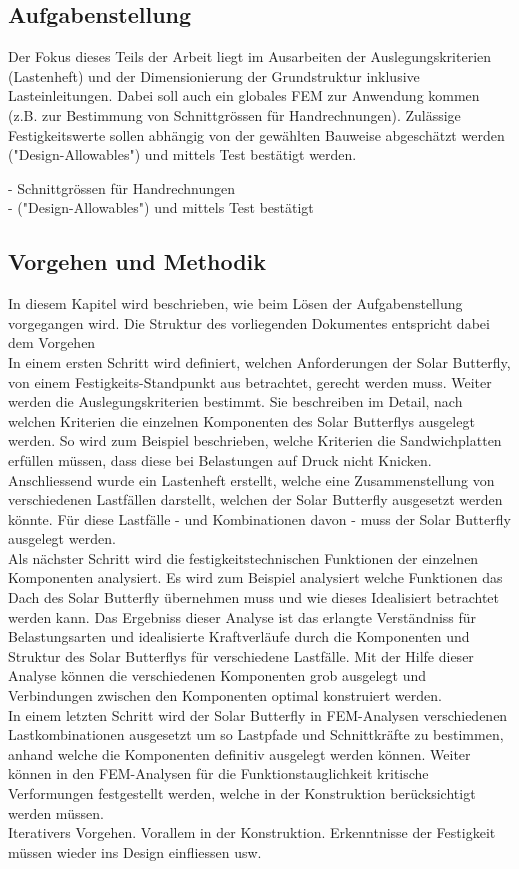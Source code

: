 \subsection{Aufgabenstellung}
Der Fokus dieses Teils der Arbeit liegt im Ausarbeiten der Auslegungskriterien (Lastenheft) und der Dimensionierung der Grundstruktur inklusive Lasteinleitungen.
Dabei soll auch ein globales FEM zur Anwendung kommen (z.B. zur Bestimmung von Schnittgrössen für Handrechnungen).
Zulässige Festigkeitswerte sollen abhängig von der gewählten Bauweise abgeschätzt werden ("Design-Allowables") und mittels Test bestätigt werden.

  - Schnittgrössen für Handrechnungen\\
  - ("Design-Allowables") und mittels Test bestätigt

\subsection{Vorgehen und Methodik}
In diesem Kapitel wird beschrieben, wie beim Lösen der Aufgabenstellung vorgegangen wird. Die Struktur des vorliegenden Dokumentes entspricht dabei dem Vorgehen\\

In einem ersten Schritt wird definiert, welchen Anforderungen der Solar Butterfly, von einem Festigkeits-Standpunkt aus betrachtet, gerecht werden muss. Weiter werden die Auslegungskriterien bestimmt. Sie beschreiben im Detail, nach welchen Kriterien die einzelnen Komponenten des Solar Butterflys ausgelegt werden. So wird zum Beispiel beschrieben, welche Kriterien die Sandwichplatten erfüllen müssen, dass diese bei Belastungen auf Druck nicht Knicken.\\
Anschliessend wurde ein Lastenheft erstellt, welche eine Zusammenstellung von verschiedenen Lastfällen darstellt, welchen der Solar Butterfly ausgesetzt werden könnte. Für diese Lastfälle - und Kombinationen davon - muss der Solar Butterfly ausgelegt werden.\\
Als nächster Schritt wird die festigkeitstechnischen Funktionen der einzelnen Komponenten analysiert. Es wird zum Beispiel analysiert welche Funktionen das Dach des Solar Butterfly übernehmen muss und wie dieses Idealisiert betrachtet werden kann. Das Ergebniss dieser Analyse ist das erlangte Verständniss für Belastungsarten und idealisierte Kraftverläufe durch die Komponenten und Struktur des Solar Butterflys für verschiedene Lastfälle. Mit der Hilfe dieser Analyse können die verschiedenen Komponenten grob ausgelegt und Verbindungen zwischen den Komponenten optimal konstruiert werden.\\
In einem letzten Schritt wird der Solar Butterfly in FEM-Analysen verschiedenen Lastkombinationen ausgesetzt um so Lastpfade und Schnittkräfte zu bestimmen, anhand welche die Komponenten definitiv ausgelegt werden können. Weiter können in den FEM-Analysen für die Funktionstauglichkeit kritische Verformungen festgestellt werden, welche in der Konstruktion berücksichtigt werden müssen.\\
Iterativers Vorgehen. Vorallem in der Konstruktion. Erkenntnisse der Festigkeit müssen wieder ins Design einfliessen usw.



